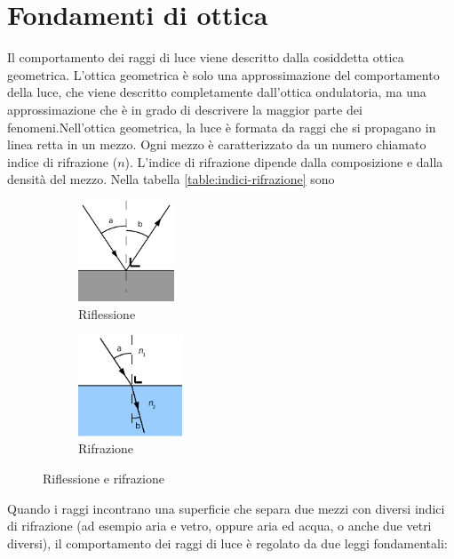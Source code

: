 \section{Fondamenti di ottica}

Il comportamento dei raggi di luce viene descritto dalla cosiddetta ottica
geometrica. L'ottica geometrica è solo una approssimazione del comportamento
della luce, che viene descritto completamente dall'ottica ondulatoria, ma una
approssimazione che è in grado di descrivere la maggior parte dei
fenomeni.Nell'ottica geometrica, la luce è formata da raggi che si propagano
in linea retta in un mezzo. Ogni mezzo è caratterizzato da un numero chiamato
indice di rifrazione ($n$). L'indice di rifrazione dipende dalla composizione
e dalla densità del mezzo. Nella tabella \ref{table:indici-rifrazione} sono



\begin{figure}[!ht]
\begin{subfigure}[t]{.5\textwidth}
\centering
\caption{Riflessione}
\label{sub:riflessione}
\includegraphics[height=3cm]{img/riflessione.pdf}

\end{subfigure}
\begin{subfigure}[t]{.5\textwidth}
\caption{Rifrazione}
\label{sub:rifrazione}
\centering
\includegraphics[height=3cm]{img/rifrazione.pdf}


\end{subfigure}
\caption{Riflessione e rifrazione}
\label{fig:riflessione-rifrazione}
\end{figure}


Quando i raggi incontrano una superficie che separa due mezzi con diversi
indici di rifrazione (ad esempio aria e vetro, oppure aria ed acqua, o anche
due vetri diversi), il comportamento dei raggi di luce è regolato da due leggi
fondamentali:

